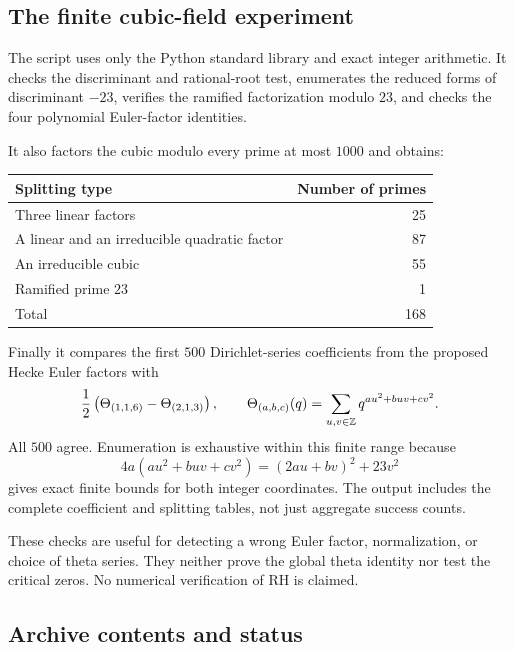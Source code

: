 \subsection{The finite cubic-field experiment}

The script  uses only the Python standard library and exact integer arithmetic. It checks the discriminant and rational-root test, enumerates the reduced forms of discriminant \(-23\), verifies the ramified factorization modulo \(23\), and checks the four polynomial Euler-factor identities.

It also factors the cubic modulo every prime at most \(1000\) and obtains:

\begin{center}
\begin{tabular}{lr}
\toprule
Splitting type & Number of primes\\
\midrule
Three linear factors & 25\\
A linear and an irreducible quadratic factor & 87\\
An irreducible cubic & 55\\
Ramified prime \(23\) & 1\\
\midrule
Total & 168\\
\bottomrule
\end{tabular}
\end{center}

Finally it compares the first \(500\) Dirichlet-series coefficients from the proposed Hecke Euler factors with
\[
\frac12\left(\Theta_{(1,1,6)}-\Theta_{(2,1,3)}\right),\qquad
\Theta_{(a,b,c)}(q)=\sum_{u,v\in\mathbb{Z}}q^{au^2+buv+cv^2}.
\]
All \(500\) agree. Enumeration is exhaustive within this finite range because
\[
4a(au^2+buv+cv^2)=(2au+bv)^2+23v^2
\]
gives exact finite bounds for both integer coordinates. The output includes the complete coefficient and splitting tables, not just aggregate success counts.

These checks are useful for detecting a wrong Euler factor, normalization, or choice of theta series. They neither prove the global theta identity nor test the critical zeros. No numerical verification of RH is claimed.

\subsection{Archive contents and status}

